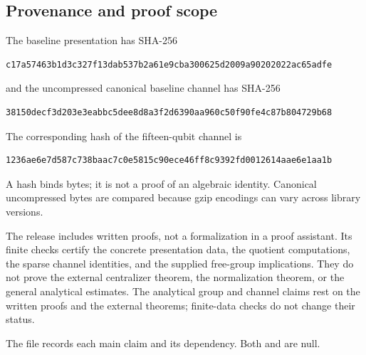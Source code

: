 \subsection{Provenance and proof scope}
The baseline presentation has SHA-256
\begin{lstlisting}
c17a57463b1d3c327f13dab537b2a61e9cba300625d2009a90202022ac65adfe
\end{lstlisting}
and the uncompressed canonical baseline channel has SHA-256
\begin{lstlisting}
38150decf3d203e3eabbc5dee8d8a3f2d6390aa960c50f90fe4c87b804729b68
\end{lstlisting}
The corresponding hash of the fifteen-qubit channel is
\begin{lstlisting}
1236ae6e7d587c738baac7c0e5815c90ece46ff8c9392fd0012614aae6e1aa1b
\end{lstlisting}
A hash binds bytes; it is not a proof of an algebraic identity. Canonical uncompressed bytes
are compared because gzip encodings can vary across library versions.

The release includes written proofs, not a formalization in a proof assistant. Its finite
checks certify the concrete presentation data, the quotient computations, the sparse channel
identities, and the supplied free-group implications. They do not prove the external
centralizer theorem, the normalization theorem, or the general analytical estimates.
The analytical group and channel claims rest on the written proofs and the external theorems;
finite-data checks do not change their status.

The file  records each main claim and its dependency. Both
 and  are null.
